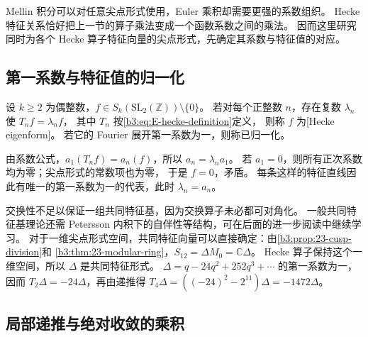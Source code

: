 Mellin 积分可以对任意尖点形式使用，Euler 乘积却需要更强的系数组织。
Hecke 特征关系恰好把上一节的算子乘法变成一个函数系数之间的乘法。
因而这里研究同时为各个 Hecke 算子特征向量的尖点形式，先确定其系数与特征值的对应。

\subsection{第一系数与特征值的归一化}
\label{b3:subsec:E0301}

\begin{definition}\label{b3:def:E-eigenform}
设 \(k\ge2\) 为偶整数，\(f\in S_k(\mathrm{SL}_2(\mathbb Z))\setminus\{0\}\)。
若对每个正整数 \(n\)，存在复数 \(\lambda_n\) 使 \(T_nf=\lambda_nf\)，
其中 \(T_n\) 按\eqref{b3:eq:E-hecke-definition}定义，
则称 \(f\) 为[Hecke eigenform]。
若它的 Fourier 展开第一系数为一，则称已归一化。
\end{definition}
由系数公式，\(a_1(T_nf)=a_n(f)\)，所以 \(a_n=\lambda_n a_1\)。
若 \(a_1=0\)，则所有正次系数均为零；尖点形式的常数项也为零，
于是 \(f=0\)，矛盾。
每条这样的特征直线因此有唯一的第一系数为一的代表，此时 \(\lambda_n=a_n\)。

\ProseParagraphBreak

交换性不足以保证一组共同特征基，因为交换算子未必都可对角化。
一般共同特征基理论还需 Petersson 内积下的自伴性等结构，可在后面的进一步阅读中继续学习。
对于一维尖点形式空间，共同特征向量可以直接确定：由\cref{b3:prop:23-cusp-division}和
\cref{b3:thm:23-modular-ring}，\(S_{12}=\Delta M_0=\mathbb C\Delta\)。
Hecke 算子保持这个一维空间，所以 \(\Delta\) 是共同特征形式。
\(\Delta=q-24q^2+252q^3+\cdots\) 的第一系数为一，因而
\(T_2\Delta=-24\Delta\)，再由递推得
\(T_4\Delta=((-24)^2-2^{11})\Delta=-1472\Delta\)。

\subsection{局部递推与绝对收敛的乘积}
\label{b3:subsec:E0302}

